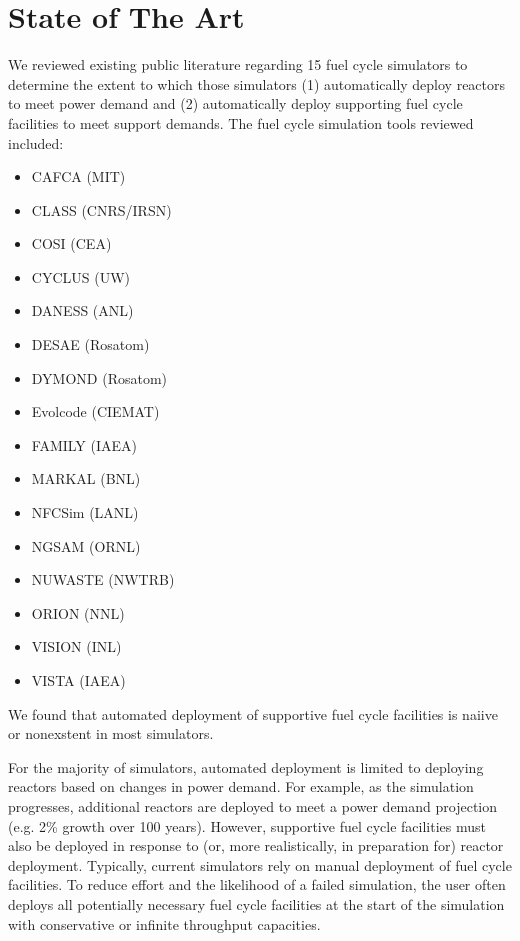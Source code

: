 \section{State of The Art}

We reviewed existing public literature regarding 15 fuel cycle simulators to 
determine the extent to which those simulators (1) automatically deploy reactors to 
meet power demand and (2) automatically deploy supporting fuel cycle facilities 
to meet support demands. The fuel cycle simulation tools reviewed included:

\begin{itemize}
        \item CAFCA (MIT) \cite{guerin_impact_2009}
        \item CLASS (CNRS/IRSN) \cite{mouginot_class_2012}
        \item COSI (CEA) \cite{coquelet-pascal_cosi6:_2015,boucher_international_2010}
        \item CYCLUS (UW) \cite{huff_fundamental_2014}
        \item DANESS (ANL) \cite{van_den_durpel_daness:_2006}
        \item DESAE (Rosatom) \cite{boucher_international_2010}
        \item DYMOND (Rosatom) \cite{boucher_international_2010}
        \item Evolcode (CIEMAT) \cite{boucher_international_2010}
        \item FAMILY (IAEA) \cite{boucher_international_2010}
        \item MARKAL (BNL) \cite{feng_standardized_2016}
        \item NFCSim (LANL) \cite{schneider_nfcsim:_2005}
        \item NGSAM (ORNL) \cite{aubin_development_2013}
        \item NUWASTE (NWTRB) \cite{garrick_nuclear_2011}
        \item ORION (NNL) \cite{feng_standardized_2016}
        \item VISION (INL) \cite{feng_standardized_2016,boucher_international_2010}
        \item VISTA (IAEA) \cite{iaea_nuclear_2007}
\end{itemize}

We found that automated deployment of supportive fuel cycle facilities is naiive or 
nonexstent in most simulators. 

For the majority of simulators, automated deployment is limited to deploying 
reactors based on changes in power demand. 
For example, as the simulation 
progresses, additional reactors are deployed to meet a power demand projection 
(e.g. 2\% growth over 100 years). 
However, supportive fuel cycle facilities must also be deployed in response to 
(or, more realistically, in preparation for) reactor deployment.  
Typically, current simulators rely on manual deployment of fuel cycle 
facilities. To reduce effort and the likelihood of a failed simulation, the 
user often deploys all potentially necessary fuel cycle facilities at the start 
of the simulation with conservative or infinite throughput capacities. 

